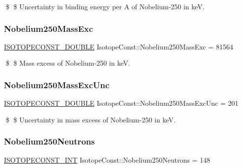 \$ \$ Uncertainty in binding energy per A of Nobelium-\/250 in keV. \mbox{\label{group___isotope_const-_nobelium-_no250_gaad2ca777063a9a36ad088ce19f85f598}} 
\subsubsection{\texorpdfstring{Nobelium250\+Mass\+Exc}{Nobelium250MassExc}}
{\footnotesize\ttfamily \mbox{\hyperlink{group___isotope_const-_macros_ga8f45a7272ce02c0b4c65c44636ed719a}{I\+S\+O\+T\+O\+P\+E\+C\+O\+N\+S\+T\+\_\+\+D\+O\+U\+B\+LE}} Isotope\+Const\+::\+Nobelium250\+Mass\+Exc = 81564}

\$ \$ Mass excess of Nobelium-\/250 in keV. \mbox{\label{group___isotope_const-_nobelium-_no250_ga0f53e650a8a9f723e51bc957904d1b95}} 
\subsubsection{\texorpdfstring{Nobelium250\+Mass\+Exc\+Unc}{Nobelium250MassExcUnc}}
{\footnotesize\ttfamily \mbox{\hyperlink{group___isotope_const-_macros_ga8f45a7272ce02c0b4c65c44636ed719a}{I\+S\+O\+T\+O\+P\+E\+C\+O\+N\+S\+T\+\_\+\+D\+O\+U\+B\+LE}} Isotope\+Const\+::\+Nobelium250\+Mass\+Exc\+Unc = 201}

\$ \$ Uncertainty in mass excess of Nobelium-\/250 in keV. \mbox{\label{group___isotope_const-_nobelium-_no250_gab3899b7abe0016d272fd61646579796a}} 
\subsubsection{\texorpdfstring{Nobelium250\+Neutrons}{Nobelium250Neutrons}}
{\footnotesize\ttfamily \mbox{\hyperlink{group___isotope_const-_macros_ga5f18360b3e99483a35c32d789e62621c}{I\+S\+O\+T\+O\+P\+E\+C\+O\+N\+S\+T\+\_\+\+I\+NT}} Isotope\+Const\+::\+Nobelium250\+Neutrons = 148}

